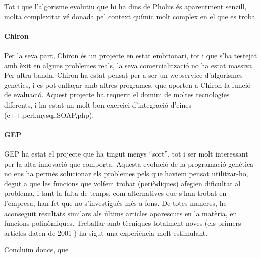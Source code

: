 Tot i que l'algorisme evolutiu que hi ha dins de Pholus és aparentment senzill,
molta complexitat vé donada pel context químic molt complex en el que es troba.

\paragraph{Chiron} %
\label{par:Chiron}

Per la seva part, Chiron és un projecte en estat embrionari, tot i que s'ha testejat amb
èxit en alguns problemes reals, la seva comercialització no ha estat massiva.
Per altra banda, Chiron ha estat pensat per a ser un webservice d'algorismes genètics,
i es pot enllaçar amb altres programes, que aporten a Chiron la funció de
evaluació.  Aquest projecte ha requerit el domini de moltes tecnologíes
diferents, i ha estat un molt bon exercici d'integració d'eines
(c++,perl,mysql,SOAP,php).

\paragraph{GEP} %
\label{par:GEP}
GEP ha estat el projecte que ha tingut menys ``sort'', tot i ser molt
interessant per la alta innovació que comporta.  Aquesta evolució de la programació
genètica no ens ha permès solucionar els problemes pels que haviem pensat
utilitzar-ho, degut a que les funcions que volíem trobar (periòdiques) afegien
dificultat al problema, i tant la falta de temps, com alternatives que s'han
trobat en l'empresa, han fet que no s'investigués més a fons.  De totes maneres,
he aconseguit resultats similars als últims articles aparescuts en la matèria,
en funcions polinòmiques.  Treballar amb tècniques totalment noves (els primers
articles daten de 2001 \cite{ferreira:2001} ) ha sigut una experiència molt
estimulant.

Concluim doncs, que 

